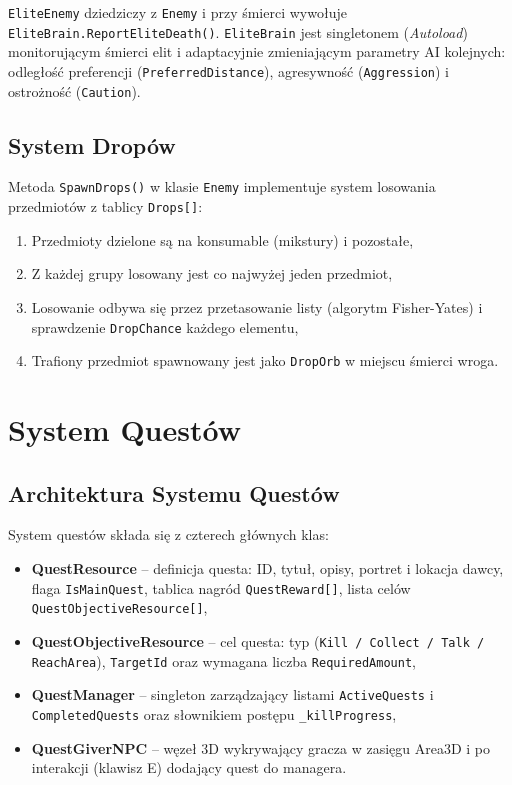 \texttt{EliteEnemy} dziedziczy z \texttt{Enemy} i przy śmierci wywołuje \texttt{EliteBrain.ReportEliteDeath()}. \texttt{EliteBrain} jest singletonem (\textit{Autoload}) monitorującym śmierci elit i adaptacyjnie zmieniającym parametry AI kolejnych: odległość preferencji (\texttt{PreferredDistance}), agresywność (\texttt{Aggression}) i ostrożność (\texttt{Caution}).

\subsection{System Dropów}

Metoda \texttt{SpawnDrops()} w klasie \texttt{Enemy} implementuje system losowania przedmiotów z tablicy \texttt{Drops[]}:

\begin{enumerate}
    \item Przedmioty dzielone są na konsumable (mikstury) i pozostałe,
    \item Z każdej grupy losowany jest co najwyżej jeden przedmiot,
    \item Losowanie odbywa się przez przetasowanie listy (algorytm Fisher-Yates) i sprawdzenie \texttt{DropChance} każdego elementu,
    \item Trafiony przedmiot spawnowany jest jako \texttt{DropOrb} w miejscu śmierci wroga.
\end{enumerate}

\section{System Questów}

\subsection{Architektura Systemu Questów}

System questów składa się z czterech głównych klas:

\begin{itemize}
    \item \textbf{QuestResource} – definicja questa: ID, tytuł, opisy, portret i lokacja dawcy, flaga \texttt{IsMainQuest}, tablica nagród \texttt{QuestReward[]}, lista celów \texttt{QuestObjectiveResource[]},
    \item \textbf{QuestObjectiveResource} – cel questa: typ (\texttt{Kill / Collect / Talk / ReachArea}), \texttt{TargetId} oraz wymagana liczba \texttt{RequiredAmount},
    \item \textbf{QuestManager} – singleton zarządzający listami \texttt{ActiveQuests} i \texttt{CompletedQuests} oraz słownikiem postępu \texttt{\_killProgress},
    \item \textbf{QuestGiverNPC} – węzeł 3D wykrywający gracza w zasięgu Area3D i po interakcji (klawisz E) dodający quest do managera.
\end{itemize}

